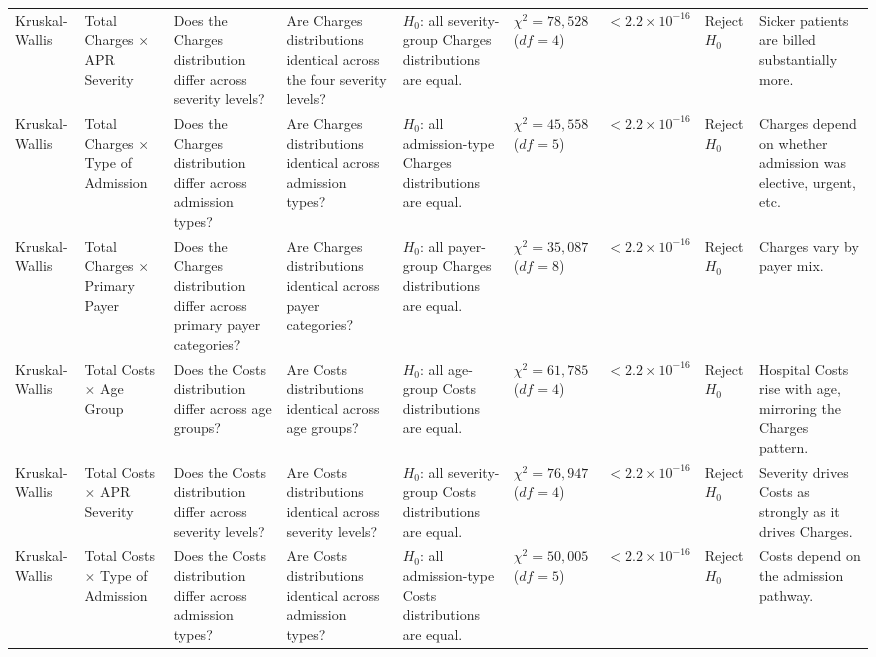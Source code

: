\documentclass[12pt]{article}
\begin{document}
\begin{landscape}
\begin{scriptsize}
\begin{longtable}{p{2.0cm} p{2.4cm} p{3.0cm} p{2.7cm} p{2.5cm} p{1.7cm} p{1.3cm} p{1.3cm} p{3.0cm}}
Kruskal-Wallis & Total Charges $\times$ APR Severity & Does the Charges distribution differ across severity levels? & Are Charges distributions identical across the four severity levels? & $H_0$: all severity-group Charges distributions are equal. & $\chi^2 = 78{,}528$ ($df=4$) & $< 2.2 \times 10^{-16}$ & Reject $H_0$ & Sicker patients are billed substantially more. \\

Kruskal-Wallis & Total Charges $\times$ Type of Admission & Does the Charges distribution differ across admission types? & Are Charges distributions identical across admission types? & $H_0$: all admission-type Charges distributions are equal. & $\chi^2 = 45{,}558$ ($df=5$) & $< 2.2 \times 10^{-16}$ & Reject $H_0$ & Charges depend on whether admission was elective, urgent, etc. \\

Kruskal-Wallis & Total Charges $\times$ Primary Payer & Does the Charges distribution differ across primary payer categories? & Are Charges distributions identical across payer categories? & $H_0$: all payer-group Charges distributions are equal. & $\chi^2 = 35{,}087$ ($df=8$) & $< 2.2 \times 10^{-16}$ & Reject $H_0$ & Charges vary by payer mix. \\

Kruskal-Wallis & Total Costs $\times$ Age Group & Does the Costs distribution differ across age groups? & Are Costs distributions identical across age groups? & $H_0$: all age-group Costs distributions are equal. & $\chi^2 = 61{,}785$ ($df=4$) & $< 2.2 \times 10^{-16}$ & Reject $H_0$ & Hospital Costs rise with age, mirroring the Charges pattern. \\

Kruskal-Wallis & Total Costs $\times$ APR Severity & Does the Costs distribution differ across severity levels? & Are Costs distributions identical across severity levels? & $H_0$: all severity-group Costs distributions are equal. & $\chi^2 = 76{,}947$ ($df=4$) & $< 2.2 \times 10^{-16}$ & Reject $H_0$ & Severity drives Costs as strongly as it drives Charges. \\

Kruskal-Wallis & Total Costs $\times$ Type of Admission & Does the Costs distribution differ across admission types? & Are Costs distributions identical across admission types? & $H_0$: all admission-type Costs distributions are equal. & $\chi^2 = 50{,}005$ ($df=5$) & $< 2.2 \times 10^{-16}$ & Reject $H_0$ & Costs depend on the admission pathway. \\


\end{longtable}
\end{scriptsize}
\end{landscape}
\end{document}
